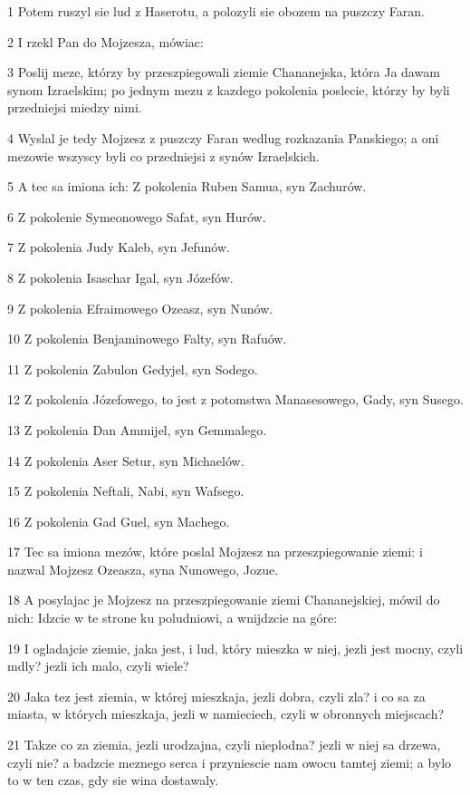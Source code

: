\par 1 Potem ruszyl sie lud z Haserotu, a polozyli sie obozem na puszczy Faran.
\par 2 I rzekl Pan do Mojzesza, mówiac:
\par 3 Poslij meze, którzy by przeszpiegowali ziemie Chananejska, która Ja dawam synom Izraelskim; po jednym mezu z kazdego pokolenia poslecie, którzy by byli przedniejsi miedzy nimi.
\par 4 Wyslal je tedy Mojzesz z puszczy Faran wedlug rozkazania Panskiego; a oni mezowie wszyscy byli co przedniejsi z synów Izraelskich.
\par 5 A tec sa imiona ich: Z pokolenia Ruben Samua, syn Zachurów.
\par 6 Z pokolenie Symeonowego Safat, syn Hurów.
\par 7 Z pokolenia Judy Kaleb, syn Jefunów.
\par 8 Z pokolenia Isaschar Igal, syn Józefów.
\par 9 Z pokolenia Efraimowego Ozeasz, syn Nunów.
\par 10 Z pokolenia Benjaminowego Falty, syn Rafuów.
\par 11 Z pokolenia Zabulon Gedyjel, syn Sodego.
\par 12 Z pokolenia Józefowego, to jest z potomstwa Manasesowego, Gady, syn Susego.
\par 13 Z pokolenia Dan Ammijel, syn Gemmalego.
\par 14 Z pokolenia Aser Setur, syn Michaelów.
\par 15 Z pokolenia Neftali, Nabi, syn Wafsego.
\par 16 Z pokolenia Gad Guel, syn Machego.
\par 17 Tec sa imiona mezów, które poslal Mojzesz na przeszpiegowanie ziemi: i nazwal Mojzesz Ozeasza, syna Nunowego, Jozue.
\par 18 A posylajac je Mojzesz na przeszpiegowanie ziemi Chananejskiej, mówil do nich: Idzcie w te strone ku poludniowi, a wnijdzcie na góre:
\par 19 I ogladajcie ziemie, jaka jest, i lud, który mieszka w niej, jezli jest mocny, czyli mdly? jezli ich malo, czyli wiele?
\par 20 Jaka tez jest ziemia, w której mieszkaja, jezli dobra, czyli zla? i co sa za miasta, w których mieszkaja, jezli w namieciech, czyli w obronnych miejscach?
\par 21 Takze co za ziemia, jezli urodzajna, czyli nieplodna? jezli w niej sa drzewa, czyli nie? a badzcie meznego serca i przyniescie nam owocu tamtej ziemi; a bylo to w ten czas, gdy sie wina dostawaly.
